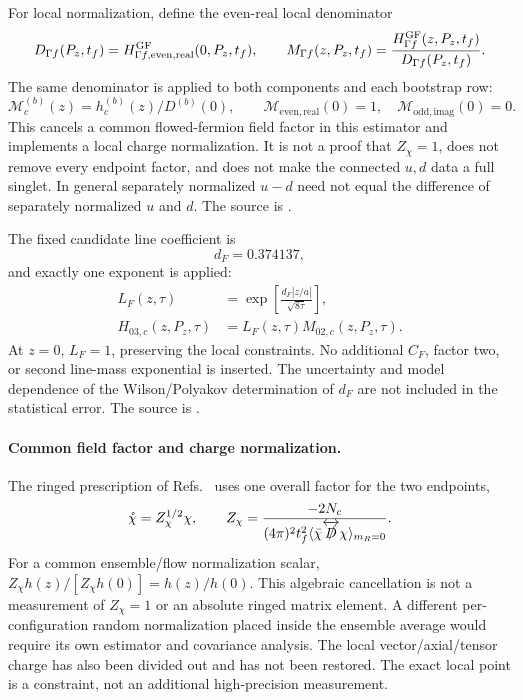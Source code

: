 \documentclass[11pt]{article}
\numberwithin{equation}{section}
\begin{document}
For local normalization, define the even-real local denominator
\begin{equation}
 D_{\Gamma f}(P_z,t_f)=H^{\rm GF}_{\Gamma f,\mathrm{even,real}}(0,P_z,t_f),
\qquad
 M_{\Gamma f}(z,P_z,t_f)=
 \frac{H^{\rm GF}_{\Gamma f}(z,P_z,t_f)}{D_{\Gamma f}(P_z,t_f)}.
\label{eq:l32x64-local-norm}
\end{equation}
The same denominator is applied to both components and each bootstrap row:
\begin{equation}
 \mathcal M_c^{(b)}(z)=h_c^{(b)}(z)/D^{(b)}(0),\qquad
 \mathcal M_{\mathrm{even,real}}(0)=1,\quad
 \mathcal M_{\mathrm{odd,imag}}(0)=0.
\end{equation}
This cancels a common flowed-fermion field factor in this estimator and
implements a local charge normalization.  It is not a proof that
\(Z_\chi=1\), does not remove every endpoint factor, and does not make the
connected \(u,d\) data a full singlet.  In general separately normalized
\(u-d\) need not equal the difference of separately normalized \(u\) and
\(d\).  The source is
.

The fixed candidate line coefficient is
\begin{equation}
 d_F=0.374137,
\end{equation}
and exactly one exponent is applied:
\begin{align}
 L_F(z,\tau)&=\exp\left[
 \frac{d_F|z/a|}{\sqrt{8\tau}}\right],\\
 H_{03,c}(z,P_z,\tau)&=L_F(z,\tau)M_{02,c}(z,P_z,\tau).
\label{eq:l32x64-line-subtraction}
\end{align}
At \(z=0\), \(L_F=1\), preserving the local constraints.  No additional
\(C_F\), factor two, or second line-mass exponential is inserted.  The
uncertainty and model dependence of the Wilson/Polyakov determination of
\(d_F\) are not included in the statistical error.  The source is
.

\paragraph{Common field factor and charge normalization.}
The ringed prescription of Refs.~\cite{MakinoSuzuki2014,BrambillaWang2024}
uses one overall factor for the two endpoints,
\begin{equation}
 \mathring\chi=Z_\chi^{1/2}\chi,\qquad
 Z_\chi=
 \frac{-2N_c}{(4\pi)^2t_f^2
 \langle\bar\chi\overleftrightarrow{\slashed D}\chi\rangle_{m_R=0}}.
\label{eq:l32x64-ringed}
\end{equation}
For a common ensemble/flow normalization scalar,
\(Z_\chi h(z)/[Z_\chi h(0)]=h(z)/h(0)\).
This algebraic cancellation is not a measurement of \(Z_\chi=1\) or an
absolute ringed matrix element.  A different per-configuration random
normalization placed inside the ensemble average would require its own
estimator and covariance analysis.  The local vector/axial/tensor charge
has also been divided out and has not been restored.  The exact local
point is a constraint, not an additional high-precision measurement.
\end{document}
